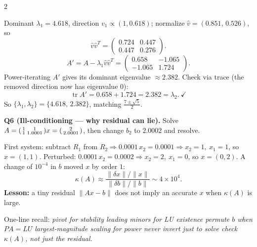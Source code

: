 \documentclass[10pt,a4paper]{article}
\newenvironment{sol}%
  {\par\vspace{2pt}\begingroup\setlength{\fboxsep}{5pt}%
   \begin{lrbox}{\sbx}\begin{minipage}{\dimexpr\linewidth-2\fboxsep\relax}}%
  {\end{minipage}\end{lrbox}\colorbox{solbg}{\usebox{\sbx}}\endgroup\par\vspace{4pt}}
\begin{document}
\begin{multicols}{2}
\begin{sol}
Dominant $\lambda_1=4.618$, direction $v_1\propto(1,0.618)$; normalize
$\hat v=(0.851,\,0.526)$, so
\[ \hat v\hat v^{T}=\begin{pmatrix}0.724&0.447\\0.447&0.276\end{pmatrix}. \]
\[ A'=A-\lambda_1\hat v\hat v^{T}=\begin{pmatrix}0.658&-1.065\\-1.065&1.724\end{pmatrix}. \]
Power-iterating $A'$ gives its dominant eigenvalue $\approx2.382$. Check via trace (the removed direction now has eigenvalue $0$):
\[ \operatorname{tr}A'=0.658+1.724=2.382=\lambda_2.\ \checkmark \]
So $\{\lambda_1,\lambda_2\}=\{4.618,\,2.382\}$, matching $\tfrac{7\pm\sqrt5}{2}$.
\end{sol}

\textbf{Q6 (Ill-conditioning — why residual can lie).} Solve
$A=\begin{psmallmatrix}1&1\\1&1.0001\end{psmallmatrix}x=\begin{psmallmatrix}2\\2.0001\end{psmallmatrix}$,
then change $b_2$ to $2.0002$ and resolve.

\begin{sol}
First system: subtract $R_1$ from $R_2\Rightarrow 0.0001\,x_2=0.0001\Rightarrow x_2=1,\ x_1=1$, so $x=(1,1)$.
Perturbed: $0.0001\,x_2=0.0002\Rightarrow x_2=2,\ x_1=0$, so $x=(0,2)$.
A change of $10^{-4}$ in $b$ moved $x$ by order $1$:
\[ \kappa(A)\approx\frac{\lVert\delta x\rVert/\lVert x\rVert}{\lVert\delta b\rVert/\lVert b\rVert}\sim 4\times10^{4}. \]
\textbf{Lesson:} a tiny residual $\lVert Ax-b\rVert$ does not imply an accurate $x$ when $\kappa(A)$ is large.
\end{sol}

\end{multicols}

\vspace{2pt}
\begin{center}\footnotesize\color{gray}
One-line recall: \emph{pivot for stability \;\textbullet\; leading minors for LU existence \;\textbullet\; permute $b$ when $PA=LU$ \;\textbullet\; largest-magnitude scaling for power \;\textbullet\; never invert just to solve \;\textbullet\; check $\kappa(A)$, not just the residual.}
\end{center}
\end{document}
